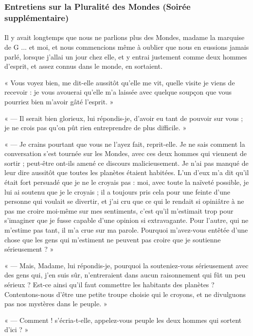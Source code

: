 \documentclass[a4paper, 11pt, oneside, landscape]{article}
\begin{document}
\subsubsection{Entretiens sur la Pluralité des Mondes (Soirée supplémentaire)}
\paragraph{}
Il y avait longtemps que nous ne parlions plus des Mondes, madame la marquise de G ... et moi, et nous commencions même à oublier que nous en eussions jamais parlé, lorsque j'allai un jour chez elle, et y entrai justement comme deux hommes d'esprit, et assez connus dans le monde, en sortaient.

« Vous voyez bien, me dit-elle aussitôt qu'elle me vit, quelle visite je viens de recevoir : je vous avouerai qu'elle m'a laissée avec quelque soupçon que vous pourriez bien m'avoir gâté l'esprit. »

« --- Il serait bien glorieux, lui répondis-je, d'avoir eu tant de pouvoir sur vous ; je ne crois pas qu'on pût rien entreprendre de plus difficile. »

« --- Je crains pourtant que vous ne l'ayez fait, reprit-elle. Je ne sais comment la conversation s'est tournée sur les Mondes, avec ces deux hommes qui viennent de sortir ; peut-être ont-ils amené ce discours malicieusement. Je n'ai pas manqué de leur dire aussitôt que toutes les planètes étaient habitées. L'un d'eux m'a dit qu'il était fort persuadé que je ne le croyais pas : moi, avec toute la naïveté possible, je lui ai soutenu que je le croyais ; il a toujours pris cela pour une feinte d'une personne qui voulait se divertir, et j'ai cru que ce qui le rendait si opiniâtre à ne pas me croire moi-même sur mes sentiments, c'est qu'il m'estimait trop pour s'imaginer que je fusse capable d'une opinion si extravagante. Pour l'autre, qui ne m'estime pas tant, il m'a crue sur ma parole. Pourquoi m'avez-vous entêtée d'une chose que les gens qui m'estiment ne peuvent pas croire que je soutienne sérieusement ? »

« --- Mais, Madame, lui répondis-je, pourquoi la souteniez-vous sérieusement avec des gens qui, j'en suis sûr, n'entreraient dans aucun raisonnement qui fût un peu sérieux ? Est-ce ainsi qu'il faut commettre les habitants des planètes ? Contentons-nous d'être une petite troupe choisie qui le croyons, et ne divulguons pas nos mystères dans le peuple. »

« --- Comment ! s'écria-t-elle, appelez-vous peuple les deux hommes qui sortent d'ici ? »
\end{document}
